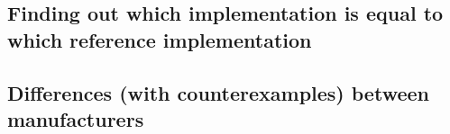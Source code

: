 \documentclass[11pt,a4paper]{article}
\begin{document}

\subsection{Finding out which implementation is equal to which reference implementation}

\subsection{Differences (with counterexamples) between manufacturers}
\end{document}
